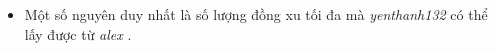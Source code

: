 \begin{itemize}
	\item     Một số nguyên duy nhất là số lượng đồng xu tối đa mà    \emph{     yenthanh132    }    có thể lấy được từ    \emph{     alex    }    .   
\end{itemize}